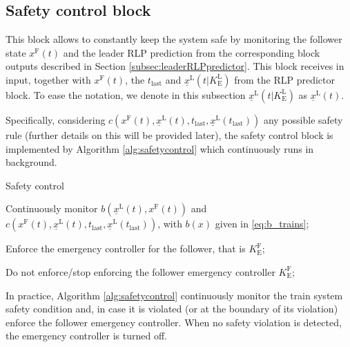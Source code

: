 \documentclass[letterpaper, 10 pt, conference]{ieeeconf}
\theoremstyle{definition}
\theoremstyle{nopoint}
\begin{document}
 
\subsection{Safety control block}
 \label{subsec:safetycontrolblock} 

This block allows to constantly keep the system safe by monitoring the follower state $x^\mathrm{F}(t)$ and the leader RLP prediction from the corresponding block outputs described in Section \ref{subsec:leaderRLPpredictor}. This block receives in input, together with $x^\mathrm{F} (t)$, the $t_\mathrm{last}$ and $\underline{x}^\mathrm{L}(t| K_\mathrm{E}^\mathrm{L})$ from the RLP predictor block. To ease the notation, we denote in this subsection $\underline{x}^\mathrm{L}(t| K_\mathrm{E}^\mathrm{L})$ as $ \underline{x}^\mathrm{L}(t)$.


Specifically, considering $c(x^\mathrm{F}(t),\underline{x}^\mathrm{L}(t),t_{\mathrm{last}},\underline{x}^\mathrm{L}(t_{\mathrm{last}}))$ any possible safety rule (further details on this will be provided later), the safety control block is implemented by Algorithm \ref{alg:safetycontrol} which continuously runs in background.

\begin{algorithm}
\caption{Safety control}\label{alg:safetycontrol}
\begin{algorithmic}[1]
\Loop

\State Continuously monitor $b({\underline{x}^\mathrm{L}} (t),{x^\mathrm{F}}(t))$ and $c(x^\mathrm{F}(t),\underline{x}^\mathrm{L}(t),t_{\mathrm{last}},\underline{x}^\mathrm{L}(t_{\mathrm{last}}))$, with $b(x)$ given in \eqref{eq:b_trains};

 
\State Enforce the emergency controller for the follower, that is $K_\mathrm{E}^\mathrm{F}$;

\Else  

Do not enforce/stop enforcing the follower emergency controller $K_\mathrm{E}^\mathrm{F}$;

\EndIf


\EndLoop

\end{algorithmic}
\end{algorithm}


In practice, Algorithm \ref{alg:safetycontrol} continuously monitor the train system safety condition and, in case it is violated (or at the boundary of its violation) enforce the follower emergency controller. When no safety violation is detected, the emergency controller is turned off. 
\end{document}
